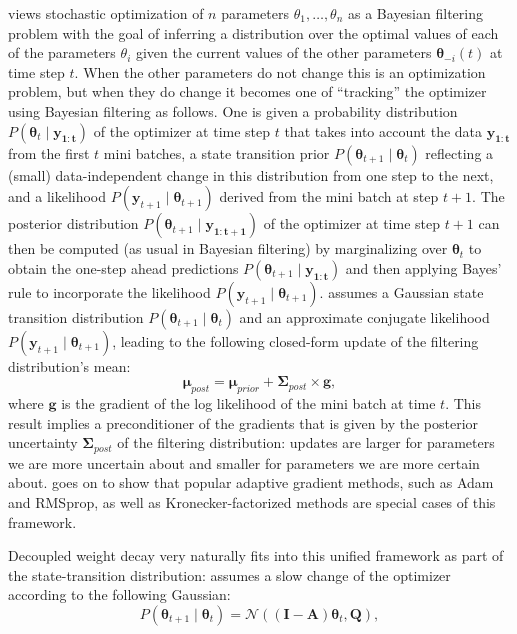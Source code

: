 \documentclass[usenames,dvipsnames]{article}
\begin{document}
\citet{aitchison18} views stochastic optimization of $n$ parameters $\theta_1, \dots, \theta_n$ as a Bayesian filtering problem with the goal of inferring a distribution over the optimal values of each of the parameters $\theta_i$ given the current values of the other parameters $\bm{\theta}_{-i}(t)$ at time step $t$. When the other parameters do not change this is an optimization problem, but when they do change it becomes one of ``tracking'' the optimizer using Bayesian filtering as follows. One is given a probability distribution $P(\bm{\theta}_{t} \mid \bm{y_{1:t}})$ of the optimizer at time step $t$ that takes into account the data $\bm{y_{1:t}}$ from the first $t$ mini batches, a state transition prior $P(\bm{\theta}_{t+1} \mid \bm{\theta}_t)$ reflecting a (small) data-independent change in this distribution from one step to the next, and a likelihood $P(\bm{y}_{t+1} \mid \bm{\theta}_{t+1})$ derived from the mini batch at step $t+1$. The posterior distribution $P(\bm{\theta}_{t+1} \mid \bm{y_{1:t+1}})$ of the optimizer at time step $t+1$ can then be computed (as usual in Bayesian filtering) by marginalizing over $\bm{\theta}_{t}$ to obtain the one-step ahead predictions $P(\bm{\theta}_{t+1} \mid \bm{y_{1:t}})$ and then applying Bayes' rule to incorporate the likelihood $P(\bm{y}_{t+1} \mid \bm{\theta}_{t+1})$. \citet{aitchison18} assumes a Gaussian state transition distribution $P(\bm{\theta}_{t+1} \mid \bm{\theta}_t)$ and an approximate conjugate likelihood $P(\bm{y}_{t+1} \mid \bm{\theta}_{t+1})$, leading to the following closed-form update of the filtering distribution's mean:
\begin{equation}
\bm{\mu}_{post} = \bm{\mu}_{prior} + \bm{\Sigma}_{post} \times \bm{g},
\end{equation}
where $\bm{g}$ is the gradient of the log likelihood of the mini batch at time $t$.
This result implies a preconditioner of the gradients that is given by the posterior uncertainty $\bm{\Sigma}_{post}$ of the filtering distribution: updates are larger for parameters we are more uncertain about and smaller for parameters we are more certain about. 
\citet{aitchison18} goes on to show that popular adaptive gradient methods, such as Adam and RMSprop, as well as Kronecker-factorized methods are special cases of this framework.

Decoupled weight decay very naturally fits into this unified framework as part of the state-transition distribution: \citet{aitchison18} assumes a slow change of the optimizer according to the following Gaussian:
\begin{equation}
\label{eq:aitchison}P(\bm{\theta}_{t+1} \mid \bm{\theta}_t) = \mathcal{N}((\bm{I}-\bm{A}) \bm{\theta}_t, \bm{Q}),
\end{equation}
\end{document}
